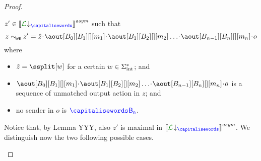 \begin{proof}
\begin{description}
 $z'\in\asem{\proj{\clang}{}}$ such that 
 $$z\commds z' = \hat z \cat\aout[B_0][B_1][][m_1]\cat\aout[B_1][B_2][][m_2]\ldots\cat\aout[B_{n-1}][B_n][][m_n]\cat o$$
  where
  \begin{itemize}
  \item
 $\hat z = \ssplit[\acword]$ for a certain $w\in\Sigma_{\text{int}}^*$; and 
 \item 
 $\aout[B_0][B_1][][m_1]\cat\aout[B_1][B_2][][m_2]\ldots\cat\aout[B_{n-1}][B_n][][m_n]\cat o$ is a sequence
 of unmatched 
 output action in $z$; and
 \item
 no sender in $o$ is $\ptp[B_n]$.
 \end{itemize}  
 Notice that, by Lemma YYY, also $z'$ is maximal in $\asem{\proj{\clang}{}}$.
 We distinguish now the two following possible cases.\\
%
%
%
%
%
%

\end{description}
\end{proof}
